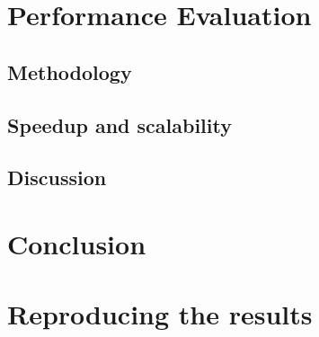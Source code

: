 \documentclass[11pt,a4paper]{article}
\begin{document}
\section{Performance Evaluation}

\subsection{Methodology}




\subsection{Speedup and scalability}

\subsection{Discussion}


\section{Conclusion}

\appendix
\section{Reproducing the results}
\end{document}
